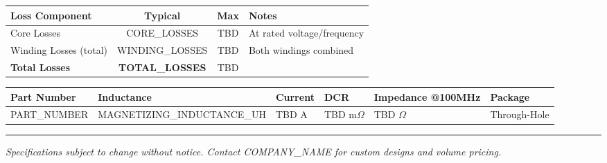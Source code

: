 \documentclass[10pt,a4paper]{article}
\begin{document}
{\footnotesize
\begin{center}
\begin{tabular}{|l|c|c|l|}
\hline
\rowcolor{tableheader}
\textbf{Loss Component} & \textbf{Typical} & \textbf{Max} & \textbf{Notes} \\
\hline
Core Losses & {{CORE_LOSSES}} & TBD & At rated voltage/frequency \\
\hline
Winding Losses (total) & {{WINDING_LOSSES}} & TBD & Both windings combined \\
\hline
\textbf{Total Losses} & \textbf{{{TOTAL_LOSSES}}} & TBD & \\
\hline
\end{tabular}
\end{center}
}

\vspace{4mm}

\noindent{\normalsize\bfseries\textcolor{wurthred}{Typical Application Circuit}}
\vspace{2mm}

\begin{center}
\end{center}

\vspace{3mm}

\noindent{\normalsize\bfseries\textcolor{wurthred}{Ordering Information}}
\vspace{2mm}

{\footnotesize
\begin{tabular}{|l|l|l|l|l|l|}
\hline
\rowcolor{tableheader}
\textbf{Part Number} & \textbf{Inductance} & \textbf{Current} & \textbf{DCR} & \textbf{Impedance @100MHz} & \textbf{Package} \\
\hline
{{PART_NUMBER}} & {{MAGNETIZING_INDUCTANCE_UH}} & TBD A & TBD m$\Omega$ & TBD $\Omega$ & Through-Hole \\
\hline
\end{tabular}
}

\vspace{4mm}
\hrule
\vspace{2mm}
{\footnotesize\textit{Specifications subject to change without notice. Contact {{COMPANY_NAME}} for custom designs and volume pricing.}}
\end{document}
